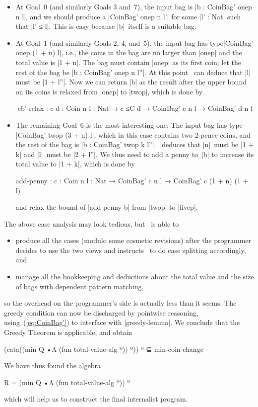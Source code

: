 \begin{itemize}
\item At Goal~0 (and similarly Goals 3 and~7), the input bag is |b : CoinBag' onep n l|, and we should produce a |CoinBag' onep n l'| for some |l' : Nat| such that |l' ≤ l|.
This is easy because |b|~itself is a suitable bag.
\item At Goal~1 (and similarly Goals 2, 4, and~5), the input bag has type\break |CoinBag' onep (1 + n) l|, i.e., the coins in the bag are no larger than |onep| and the total value is |1 + n|.
The bag must contain |onep| as its first coin; let the rest of the bag be |b : CoinBag' onep n l''|.
At this point \Agda\ can deduce that |l| must be |1 + l''|.
Now we can return |b| as the result after the upper bound on its coins is relaxed from |onep| to |twop|, which is done by
\begin{code}
^^^cb'-relax :
  {c d : Coin} {n l : Nat} → c ≤C d → CoinBag' c n l → CoinBag' d n l
\end{code}
\item The remaining Goal~6 is the most interesting one:
The input bag has type |CoinBag' twop (3 + n) l|, which in this case contains two 2-pence coins, and the rest of the bag is |b : CoinBag' twop k l''|.
\Agda\ deduces that |n|~must be |1 + k| and |l|~must be |2 + l''|.
We thus need to add a penny to~|b| to increase its total value to |1 + k|, which is done by
\begin{code}
add-penny :
  {c : Coin} {n l : Nat} → CoinBag' c n l → CoinBag' c (1 + n) (1 + l)
\end{code}
and relax the bound of |add-penny b| from |twop| to |fivep|.
\end{itemize}
The above case analysis may look tedious, but \Agda\ is able to
\begin{itemize}
\item produce all the cases (modulo some cosmetic revisions) after the programmer decides to use the two views and instructs \Agda\ to do case splitting accordingly, and
\item manage all the bookkeeping and deductions about the total value and the size of bags with dependent pattern matching,
\end{itemize}
so the overhead on the programmer's side is actually less than it seems.
The greedy condition can now be discharged by pointwise reasoning, using~(\ref{eq:CoinBag'}) to interface with |greedy-lemma|.
We conclude that the Greedy Theorem is applicable, and obtain
\begin{code}
(cata((min Q •Λ (fun total-value-alg º)) º)) º ⊆ min-coin-change
\end{code}
We have thus found the algebra
\begin{code}
R = (min Q •Λ (fun total-value-alg º)) º
\end{code}
which will help us to construct the final internalist program.

